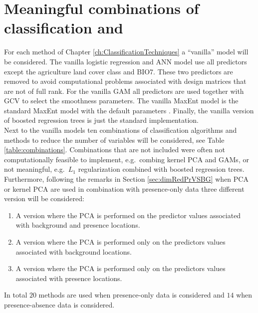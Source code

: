 \section{Meaningful combinations of classification and }
\label{sec:combinations}
 

For each method of Chapter \ref{ch:ClassificationTechniques} a ``vanilla'' model will be considered. The vanilla logistic regression and ANN model use all predictors except the agriculture land cover class and BIO7. These two predictors are removed to avoid computational problems associated with design matrices that are not of full rank. For the vanilla GAM all predictors are used together with GCV to select the smoothness parameters. The vanilla MaxEnt model is the standard MaxEnt model with the default parameters \parencite{phillips_modeling_2008}. Finally, the vanilla version of boosted regression trees is just the standard implementation. \\

Next to the vanilla models ten combinations of classification algorithms and methods to reduce the number of variables will be considered, see Table \ref{table:combinations}. Combinations that are not included were often not computationally feasible to implement, e.g.\ combing kernel PCA and GAMs, or not meaningful, e.g.\ $L_1$ regularization combined with boosted regression trees. Furthermore, following the remarks in Section \ref{sec:dimRedPrVSBG} when PCA or kernel PCA are used in combination with presence-only data three different version will be considered: \begin{enumerate}
\item A version where the PCA is performed on the predictor values associated with background and presence locations.
\item A version where the PCA is performed only on the predictors values associated with background locations.
\item A version where the PCA is performed only on the predictors values associated with presence locations.
\end{enumerate}
In total $20$ methods are used when presence-only data is considered and $14$ when presence-absence data is considered.


